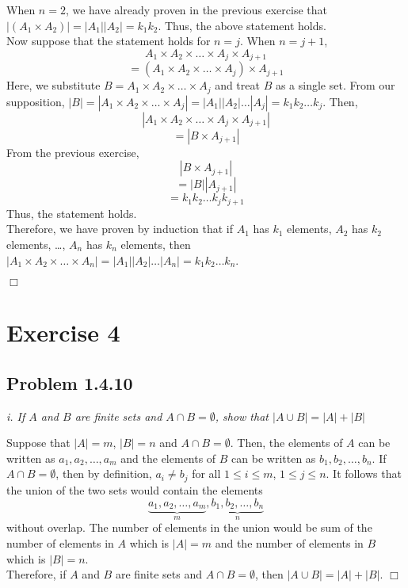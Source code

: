 \documentclass[
]{article}
\begin{document}
When \(n = 2\), we have already proven in the previous exercise that
\(|(A_1 \times A_2)| = |A_1||A_2| =k_1k_2\). Thus, the above statement
holds.\\
Now suppose that the statement holds for \(n = j\). When \(n = j+1\),
\[A_1 \times A_2 \times \dots \times A_{j} \times A_{j+1}\]
\[= (A_1 \times A_2 \times \dots \times A_j) \times A_{j+1}\] Here, we
substitute \(B = A_1 \times A_2 \times \dots \times A_j\) and treat
\(B\) as a single set. From our supposition,
\(|B| = |A_1 \times A_2 \times \dots \times A_j|=|A_1||A_2|\dots|A_j|=k_1k_2\dots k_j\).
Then, \[|A_1 \times A_2 \times \dots \times A_{j} \times A_{j+1}|\]
\[= |B \times A_{j+1}|\] From the previous exercise,
\[|B \times A_{j+1}|\] \[= |B||A_{j+1}| \] \[= k_1k_2\dots k_j k_{j+1}\]
Thus, the statement holds.\\
Therefore, we have proven by induction that if \(A_1\) has \(k_1\)
elements, \(A_2\) has \(k_2\) elements, \ldots, \(A_n\) has \(k_n\)
elements, then
\(|A_1 \times A_2 \times \dots \times A_n| = |A_1||A_2|\dots|A_n|=k_1k_2\dots k_n\).

\hfill \(\Box\)

\hypertarget{exercise-4}{%
\section{Exercise 4}\label{exercise-4}}

\hypertarget{problem-1.4.10}{%
\subsection{Problem 1.4.10}\label{problem-1.4.10}}

\emph{i. If \(A\) and \(B\) are finite sets and
\(A \cap B = \emptyset\), show that \(|A\cup B| = |A| + |B|\)}

Suppose that \(|A| = m\), \(|B| = n\) and \(A \cap B = \emptyset\).
Then, the elements of \(A\) can be written as \(a_1, a_2, \dots, a_m\)
and the elements of \(B\) can be written as \(b_1, b_2, \dots, b_n\). If
\(A \cap B = \emptyset\), then by definition, \(a_i \neq b_j\) for all
\(1 \leq i \leq m\), \(1 \leq j \leq n\). It follows that the union of
the two sets would contain the elements
\[\underbrace{a_1, a_2, \dots, a_m}_{m}, \underbrace{b_1, b_2, \dots, b_n}_{n}\]
without overlap. The number of elements in the union would be sum of the
number of elements in \(A\) which is \(|A| = m\) and the number of
elements in \(B\) which is \(|B| = n\).\\
Therefore, if \(A\) and \(B\) are finite sets and
\(A \cap B = \emptyset\), then \(|A\cup B| = |A| + |B|\).
\hfill \(\Box\)
\end{document}
